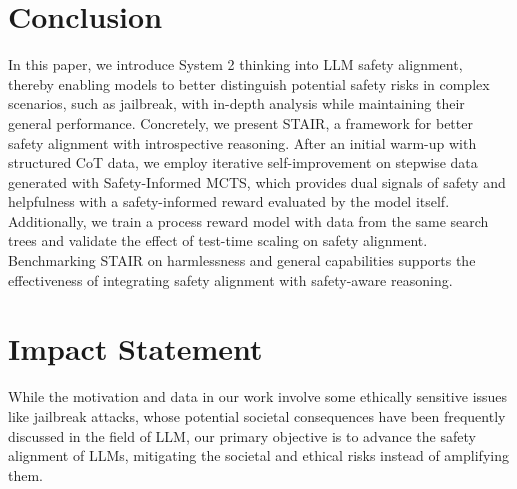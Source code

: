 \section{Conclusion}

In this paper, we introduce System 2 thinking into LLM safety alignment, thereby enabling models to better distinguish potential safety risks in complex scenarios, such as jailbreak, with in-depth analysis while maintaining their general performance. Concretely, we present STAIR, a framework for better safety alignment with introspective reasoning. After an initial warm-up with structured CoT data, we employ iterative self-improvement on stepwise data generated with Safety-Informed MCTS, which provides dual signals of safety and helpfulness with a safety-informed reward evaluated by the model itself. Additionally, we train a process reward model with data from the same search trees and validate the effect of test-time scaling on safety alignment. Benchmarking STAIR on harmlessness and general capabilities supports the effectiveness of integrating safety alignment with safety-aware reasoning.



\section*{Impact Statement}

While the motivation and data in our work involve some ethically sensitive issues like jailbreak attacks, whose potential societal consequences have been frequently discussed in the field of LLM, our primary objective is to advance the safety alignment of LLMs, mitigating the societal and ethical risks instead of amplifying them. 